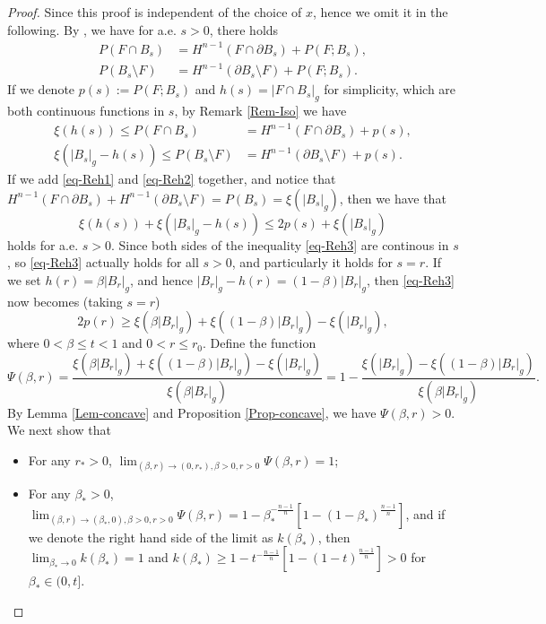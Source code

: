 \documentclass[11pt,reqno]{amsart}
\theoremstyle{definition}
\theoremstyle{remark}
\numberwithin{equation}{section}
\renewcommand{\(}{\left(}
\renewcommand{\)}{\right)}
\renewcommand{\-}{\overline}
\begin{document}
\begin{proof}
	Since this proof is independent of the choice of $x$, hence we omit it in the following. By \cite[Lemma 15.12]{Maggi-12}, we have for a.e. $s>0$, there holds
	\begin{align*}
		P(F\cap B_s)&=H^{n-1}(F\cap\partial B_s)+P(F;B_s),\\
		P(B_s\setminus F)&=H^{n-1}(\partial B_s\setminus F)+P(F;B_s).
	\end{align*}
	If we denote $p(s):=P(F;B_s)$ and $h(s)=|F\cap B_s|_g$ for simplicity, which are both continuous functions in $s$, by Remark \ref{Rem-Iso} we have
	\begin{align}
		\xi(h(s))\leq P(F\cap B_s)&=H^{n-1}(F\cap\partial B_s)+p(s),\label{eq-Reh1}\\
		\xi(|B_s|_g-h(s))\leq P(B_s\setminus F)&=H^{n-1}(\partial B_s\setminus F)+p(s).\label{eq-Reh2}
	\end{align}
	If we add \eqref{eq-Reh1} and \eqref{eq-Reh2} together, and notice that $H^{n-1}(F\cap\partial B_s)+H^{n-1}(\partial B_s\setminus F)=P(B_s)=\xi(|B_s|_g)$, then we have that
	\begin{equation}\label{eq-Reh3}
			\xi(h(s))+\xi(|B_s|_g-h(s))\leq 2p(s)+\xi(|B_s|_g)
	\end{equation}
holds for a.e. $s>0$. Since both sides of the inequality \eqref{eq-Reh3} are continous in $s$, so \eqref{eq-Reh3} actually holds for all $s>0$, and particularly it holds for $s=r$. If we set $h(r)=\beta|B_r|_g$, and hence $|B_r|_g-h(r)=(1-\beta)|B_r|_g$, then \eqref{eq-Reh3} now becomes (taking $s=r$)
\begin{equation}\label{eq-Reh4}
	2p(r)\geq \xi(\beta|B_r|_g)+\xi((1-\beta)|B_r|_g)-\xi(|B_r|_g),
\end{equation}
where $0<\beta\leq t<1$ and $0<r\leq r_0$. Define the function 
\begin{equation}\label{Defn-Psi}
	\Psi(\beta,r)=\frac{\xi(\beta|B_r|_g)+\xi((1-\beta)|B_r|_g)-\xi(|B_r|_g)}{\xi(\beta|B_r|_g)}=1-\frac{\xi(|B_r|_g)-\xi((1-\beta)|B_r|_g)}{\xi(\beta|B_r|_g)}.
\end{equation}
By Lemma \ref{Lem-concave} and Proposition \ref{Prop-concave}, we have $\Psi(\beta,r)>0$. We next show that 
\begin{itemize}
	\item[(i)] For any $r_{*}>0$, $\lim_{(\beta,r)\to(0,r_{*}),\beta>0,r>0}\Psi(\beta,r)=1$;
	\item[(ii)] For any $\beta_{*}>0$, $\lim_{(\beta,r)\to(\beta_{*},0),\beta>0,r>0}\Psi(\beta,r)=1-\beta_{*}^{-\frac{n-1}{n}}[1-(1-\beta_{*})^{\frac{n-1}{n}}]$, and if we denote the right hand side of the limit as $k(\beta_{*})$, then $\lim_{\beta_{*}\to 0}k(\beta_{*})=1$ and $k(\beta_{*})\geq 1-t^{-\frac{n-1}{n}}[1-(1-t)^{\frac{n-1}{n}}]>0$ for $\beta_{*}\in(0,t]$.

\end{itemize}
\end{proof}
\end{document}
